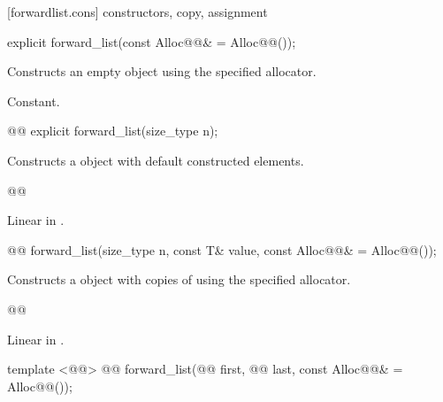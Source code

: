 \documentclass[american,twoside]{book}
\begin{document}
[forwardlist.cons]{ constructors, copy, assignment}

\begin{itemdecl}
explicit forward_list(const Alloc@@& = Alloc@@());
\end{itemdecl}

\begin{itemdescr}
\pnum
\effects Constructs an empty  object using the specified allocator.

\pnum
\complexity Constant.
\end{itemdescr}

\begin{itemdecl}
@@ explicit forward_list(size_type n);
\end{itemdecl}

\begin{itemdescr}
\pnum
\effects Constructs a  object with  default constructed elements.

\pnum
@@

\pnum
\complexity Linear in .
\end{itemdescr}

\begin{itemdecl}
@@ 
  forward_list(size_type n, const T& value, const Alloc@@& = Alloc@@());
\end{itemdecl}

\begin{itemdescr}
\pnum
\effects Constructs a  object with  copies of  using the specified allocator.

\pnum
@@

\pnum
\complexity Linear in .
\end{itemdescr}

\begin{itemdecl}
template <@@>
  @@
  forward_list(@@ first, @@ last, 
               const Alloc@@& = Alloc@@()); 
\end{itemdecl}
\end{document}
